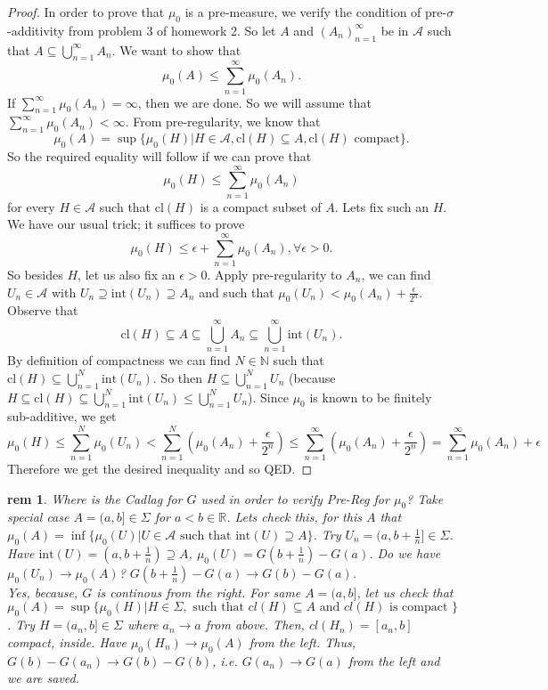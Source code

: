 \documentclass[letterpaper, 12pt]{article}
\newcommand{\fin}{\qquad \quad \hfill \framebox[1.75mm][l]{\,}}
\newcommand{\bR}{\mathbb{R}}
\newcommand{\bN}{\mathbb{N}}
\newcommand{\sA}{\mathcal{A}}
\theoremstyle{stdthm}
\theoremstyle{stddef}
\newtheorem{rem}[thm]{rem} %
\theoremstyle{stdnonum}
\theoremstyle{stdqands}
\theoremstyle{stdbold}
\begin{document}
\begin{proof}
In order to prove that $\mu_0$ is a pre-measure, we verify the condition of pre-$\sigma$-additivity from problem 3 of homework 2. So let $A$ and $(A_n)_{n=1}^\infty$ be in $\sA$ such that $A \subseteq \bigcup_{n=1}^\infty A_n$. We want to show that 
\[ \mu_0(A) \leq \sum_{n=1}^\infty \mu_0(A_n).\] 
If $\sum_{n=1}^\infty \mu_0(A_n) = \infty $, then we are done. So we will assume that $\sum_{n=1}^\infty \mu_0(A_n) < \infty$. From pre-regularity, we know that 
\[ \mu_0(A) = \sup\{\mu_0(H) | H\in \sA, \mathrm{cl}(H)\subseteq A,\mathrm{cl}(H) \text{ compact}\}.\]
So the required equality will follow if we can prove that 
\[ \mu_0(H) \leq \sum_{n=1}^\infty \mu_0(A_n)\]
for every $H \in \sA$ such that $\mathrm{cl}(H)$ is a compact subset of $A$. Lets fix such an $H$. We have our usual trick; it suffices to prove 
 \[ \mu_0(H) \leq \epsilon + \sum_{n=1}^\infty \mu_0(A_n), \forall \epsilon >0.\]
So besides $H$, let us also fix an $\epsilon >0$. Apply pre-regularity to $A_n$, we can find $U_n \in \sA$ with $U_n\supseteq \mathrm{int}(U_n) \supseteq A_n$ and such that $\mu_0(U_n) < \mu_0 (A_n) + \frac{\epsilon}{2^n}$. Observe that 
\[
\mathrm{cl}(H) \subseteq A \subseteq \bigcup_{n=1}^\infty A_n \subseteq \bigcup_{n=1}^\infty \mathrm{int}(U_n).
\]
By definition of compactness we can find $N\in \bN$ such that $\mathrm{cl}(H) \subseteq \bigcup_{n=1}^N \mathrm{int}(U_n)$. So then $H \subseteq \bigcup_{n=1}^N U_n$ (because $H \subseteq \mathrm{cl}(H) \subseteq \bigcup_{n=1}^N \mathrm{int}(U_n) \leq \bigcup_{n=1}^N U_n$). Since $\mu_0$ is known to be finitely sub-additive, we get 
\[
\mu_0(H) \leq \sum_{n=1}^N \mu_0 (U_n)
< \sum_{n=1}^N\left(\mu_0(A_n) + \frac{\epsilon}{2^n}\right) \leq \sum_{n=1}^\infty\left(\mu_0(A_n) + \frac{\epsilon}{2^n}\right)
= \sum_{n=1}^\infty\mu_0(A_n) + \epsilon
\]
Therefore we get the desired inequality and so QED. 
\end{proof}

\begin{rem}
Where is the Cadlag for $G$ used in order to verify Pre-Reg for $\mu_0$? Take special case $A = (a,b] \in \Sigma$ for $a<b \in \bR$. Lets check this, for this $A$ that $\mu_0(A) = \inf\{\mu_0 (U) | U \in \sA \text{ such that } \mbox{int}(U) \supseteq A \}$. Try $U_n = (a, b + \frac{1}{n}] \in \Sigma$. Have $\mbox{int}(U) = (a,b + \frac{1}{n}) \supseteq A$, $\mu_0(U)= G(b + \frac{1}{n}) - G(a)$. Do we have $\mu_0(U_n)\rightarrow \mu_0(A)$? $G(b + \frac{1}{n}) - G(a) \rightarrow G(b) - G(a)$. \\

\noindent Yes, because, $G$ is continous  from the right.  For same $A = (a,b]$, let us check that $\mu_0(A) = \sup\{ \mu_0(H)| H \in \Sigma, \text{ such that } cl(H) \subseteq A \text{ and } cl(H) \text{ is compact }\}$. Try $H = (a_n,b] \in \Sigma$ where $a_n \rightarrow a$ from above. Then, $cl(H_n) = [a_n,b]$ compact, inside.  Have $\mu_0(H_n) \rightarrow \mu_0(A)$ from the left. Thus,  $G(b) - G(a_n) \rightarrow G(b) - G(b)$, i.e. $G(a_n) \rightarrow G(a)$  from the left and we are saved. 
\end{rem}
\end{document}
